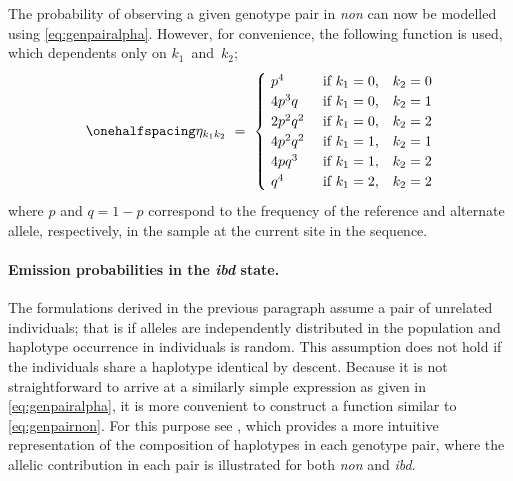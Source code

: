 The probability of observing a given genotype pair in \emph{non} can now be modelled using \cref{eq:genpairalpha}.
However, for convenience, the following function is used, which dependents only on $k_1$~and~$k_2$;
\begin{equation}\label{eq:genpairnon}\onehalfspacing
	\eta_{k_1 k_2} ~=~
  \begin{cases}
		~ p^4       & ~ \text{if $k_1 = 0$, ~ $k_2 = 0$} \\
    ~ 4 p^3 q   & ~ \text{if $k_1 = 0$, ~ $k_2 = 1$} \\
    ~ 2 p^2 q^2 & ~ \text{if $k_1 = 0$, ~ $k_2 = 2$} \\
    ~ 4 p^2 q^2 & ~ \text{if $k_1 = 1$, ~ $k_2 = 1$} \\
    ~ 4 p q^3   & ~ \text{if $k_1 = 1$, ~ $k_2 = 2$} \\
    ~ q^4       & ~ \text{if $k_1 = 2$, ~ $k_2 = 2$}
  \end{cases}
\end{equation}
where $p$ and ${q=1-p}$ correspond to the frequency of the reference and alternate allele, respectively, in the sample at the current site in the sequence.

%

%

\paragraph{Emission probabilities in the \emph{ibd} state.}
The formulations derived in the previous paragraph assume a pair of unrelated individuals; that is if alleles are independently distributed in the population and haplotype occurrence in individuals is random.
This assumption does not hold if the  individuals share a haplotype identical by descent.
Because it is not straightforward to arrive at a similarly simple expression as given in \cref{eq:genpairalpha}, it is more convenient to construct a function similar to \cref{eq:genpairnon}.
For this purpose see , which provides a more intuitive representation of the composition of haplotypes in each genotype pair, where the allelic contribution in each pair is illustrated for both \emph{non} and \emph{ibd}.


